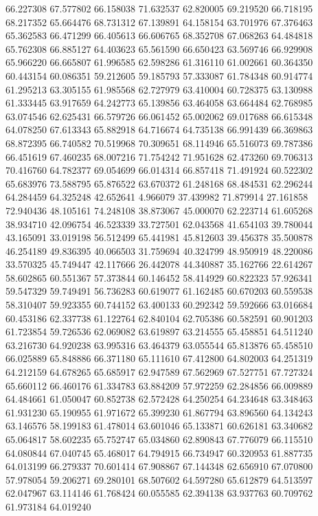 66.227308
67.577802
66.158038
71.632537
62.820005
69.219520
66.718195
68.217352
65.664476
68.731312
67.139891
64.158154
63.701976
67.376463
65.362583
66.471299
66.405613
66.606765
68.352708
67.068263
64.484818
65.762308
66.885127
64.403623
65.561590
66.650423
63.569746
66.929908
65.966220
66.665807
61.996585
62.598286
61.316110
61.002661
60.364350
60.443154
60.086351
59.212605
59.185793
57.333087
61.784348
60.914774
61.295213
63.305155
61.985568
62.727979
63.410004
60.728375
63.130988
61.333445
63.917659
64.242773
65.139856
63.464058
63.664484
62.768985
63.074546
62.625431
66.579726
66.061452
65.002062
69.017688
66.615348
64.078250
67.613343
65.882918
64.716674
64.735138
66.991439
66.369863
68.872395
66.740582
70.519968
70.309651
68.114946
65.516073
69.787386
66.451619
67.460235
68.007216
71.754242
71.951628
62.473260
69.706313
70.416760
64.782377
69.054699
66.014314
66.857418
71.491924
60.522302
65.683976
73.588795
65.876522
63.670372
61.248168
68.484531
62.296244
64.284459
64.325248
42.652641
4.966079
37.439982
71.879914
27.161858
72.940436
48.105161
74.248108
38.873067
45.000070
62.223714
61.605268
38.934710
42.096754
46.523339
33.727501
62.043568
41.654103
39.780044
43.165091
33.019198
56.512499
65.441981
45.812603
39.456378
35.500878
46.254189
49.836395
40.066503
31.759694
40.324799
48.950919
48.220086
33.570325
45.749447
42.117666
26.442078
44.340887
35.162766
22.614267
58.602865
60.551367
57.373844
60.146452
58.414929
60.822323
57.926341
59.547329
59.749491
56.736283
60.619077
61.162485
60.670203
60.559538
58.310407
59.923355
60.744152
63.400133
60.292342
59.592666
63.016684
60.453186
62.337738
61.122764
62.840104
62.705386
60.582591
60.901203
61.723854
59.726536
62.069082
63.619897
63.214555
65.458851
64.511240
63.216730
64.920238
63.995316
63.464379
63.055544
65.813876
65.458510
66.025889
65.848886
66.371180
65.111610
67.412800
64.802003
64.251319
64.212159
64.678265
65.685917
62.947589
67.562969
67.527751
67.727324
65.660112
66.460176
61.334783
63.884209
57.972259
62.284856
66.009889
64.484661
61.050047
60.852738
62.572428
64.250254
64.234648
63.348463
61.931230
65.190955
61.971672
65.399230
61.867794
63.896560
64.134243
63.146576
58.199183
61.478014
63.601046
65.133871
60.626181
63.340682
65.064817
58.602235
65.752747
65.034860
62.890843
67.776079
66.115510
64.080844
67.040745
65.468017
64.794915
66.734947
60.320953
61.887735
64.013199
66.279337
70.601414
67.908867
67.144348
62.656910
67.070800
57.978054
59.206271
69.280101
68.507602
64.597280
65.612879
64.513597
62.047967
63.114146
61.768424
60.055585
62.394138
63.937763
60.709762
61.973184
64.019240
